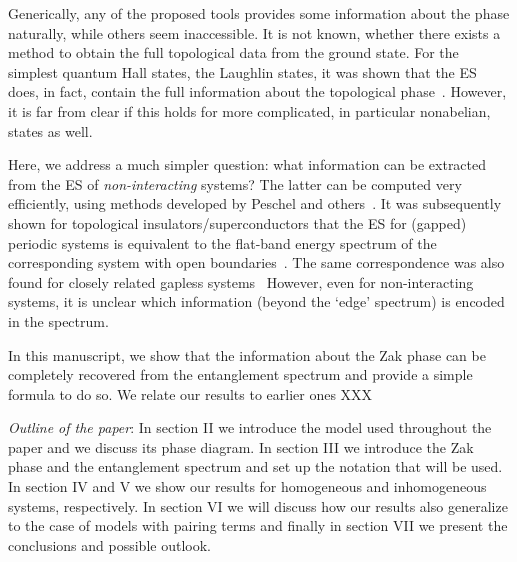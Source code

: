 \documentclass[twocolumn,amsmath,longbibliography,amssymb,superscriptaddress]{revtex4-1}
\begin{document}
Generically, any of the proposed tools provides some information about the phase naturally, while others seem inaccessible. 
It is not known, whether there exists a method to obtain the full topological data from the ground state. 
For the simplest quantum Hall states, the Laughlin states,  it was shown that the ES does, in fact, contain the full information about the topological phase~\cite{hermanns2011haldane}.
However, it is far from clear if this holds for more complicated, in particular nonabelian, states as well.  

Here, we address a much simpler question: what information can be extracted from the ES of \emph{non-interacting} systems?
The latter can be computed very efficiently, using methods developed by Peschel and others~\cite{Peschel2003}. 
It was subsequently shown for topological insulators/superconductors that the ES for (gapped) periodic systems is equivalent to the flat-band energy spectrum of the corresponding system with open boundaries~\cite{Fidkowski2010entanglement}. 
The same correspondence was also found for closely related gapless systems~\cite{Matern2018entanglement}
However, even for non-interacting systems, it is unclear which information (beyond the  `edge' spectrum) is encoded in the spectrum. 

In this manuscript, we show that the information about the Zak phase can be completely recovered from the entanglement spectrum and provide a simple formula to do so. 
We relate our results to earlier ones XXX

\emph{Outline of the paper}: In section II we introduce the model used throughout the paper and we discuss its phase diagram. In section III we introduce the Zak phase and the entanglement spectrum and set up the notation that will be used. In section IV and V we show our results for homogeneous and inhomogeneous systems, respectively. In section VI we will discuss how our results also generalize to the case of models with pairing terms and finally in section VII we present the conclusions and possible outlook.

\end{document}

